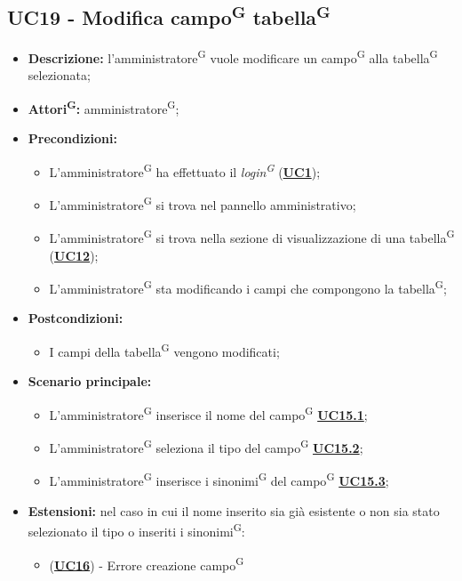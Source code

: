 \subsection{UC19 - Modifica campo\textsuperscript{G} tabella\textsuperscript{G}}
\label{sec:UC19}
\begin{itemize}
	\item \textbf{Descrizione:} l’amministratore\textsuperscript{G} vuole modificare un campo\textsuperscript{G} alla tabella\textsuperscript{G} selezionata;
	\item \textbf{Attori\textsuperscript{G}:} amministratore\textsuperscript{G};
	\item \textbf{Precondizioni:} 
	\begin{itemize}
		\item L’amministratore\textsuperscript{G} ha effettuato il \textit{login\textsuperscript{G}} (\hyperref[sec:UC1]{\textbf{UC1}});
		\item L’amministratore\textsuperscript{G} si trova nel pannello amministrativo;
		\item L’amministratore\textsuperscript{G} si trova nella sezione di visualizzazione di una tabella\textsuperscript{G} (\hyperref[sec:UC12]{\textbf{UC12}});
		\item L’amministratore\textsuperscript{G} sta modificando i campi che compongono la tabella\textsuperscript{G};
	\end{itemize}
	\item \textbf{Postcondizioni:} 
	\begin{itemize}
		\item I campi della tabella\textsuperscript{G} vengono modificati;
	\end{itemize}
	\item \textbf{Scenario principale:} 
	\begin{itemize}
		\item L’amministratore\textsuperscript{G} inserisce il nome del campo\textsuperscript{G} \hyperref[sec:UC15.1]{\textbf{UC15.1}};
		\item L'amministratore\textsuperscript{G} seleziona il tipo del campo\textsuperscript{G} \hyperref[sec:UC15.2]{\textbf{UC15.2}};
		\item L'amministratore\textsuperscript{G} inserisce i sinonimi\textsuperscript{G} del campo\textsuperscript{G} \hyperref[sec:UC15.3]{\textbf{UC15.3}};
	\end{itemize}

		\item \textbf{Estensioni:} nel caso in cui il nome inserito sia già esistente o non sia stato selezionato il tipo o inseriti i sinonimi\textsuperscript{G}:
		\begin{itemize}
			\item (\hyperref[sec:UC16]{\textbf{UC16}}) - Errore creazione campo\textsuperscript{G}
	\end{itemize}
\end{itemize}


